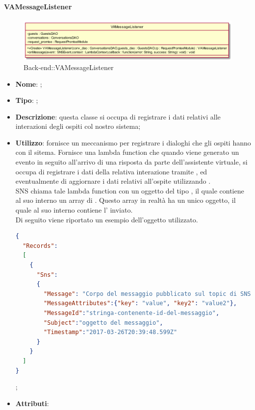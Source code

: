\hypertarget{VAMessageListener_label}{\paragraph{VAMessageListener}}
\begin{figure}[h]
	\centering
	\includegraphics[width=\textwidth,height=\textheight,keepaspectratio]{images/ClassVAMessageListener.png}
	\caption{Back-end::VAMessageListener}
\end{figure}
\begin{itemize}
	\item \textbf{Nome}: ;
	\item \textbf{Tipo}: ;
	\item \textbf{Descrizione}: questa classe si occupa di registrare i dati relativi alle interazioni degli ospiti col nostro sistema;
	\item \textbf{Utilizzo}: fornisce un meccanismo per registrare i dialoghi che gli ospiti hanno con il sitema. Fornisce una lambda function che quando viene generato un evento  in seguito all'arrivo di una risposta da parte dell'assistente virtuale, si occupa di registrare i dati della relativa interazione tramite , ed eventualmente di aggiornare i dati relativi all'ospite utilizzando . \\
SNS chiama tale lambda function con un oggetto del tipo , il quale contiene al suo interno un array di . Questo array in realtà ha un unico oggetto, il quale al suo interno contiene l' inviato. \\
Di seguito viene riportato un esempio dell'oggetto utilizzato.
\begin{lstlisting}[language=json,firstnumber=1]
{
  "Records":
  [
    {
      "Sns":
      {
        "Message": "Corpo del messaggio pubblicato sul topic di SNS",
        "MessageAttributes":{"key": "value", "key2": "value2"},
        "MessageId":"stringa-contenente-id-del-messaggio",
        "Subject":"oggetto del messaggio",
        "Timestamp":"2017-03-26T20:39:48.599Z"
      }
    }
  ]
}
\end{lstlisting};
	\item \textbf{Attributi}:

\end{itemize}
